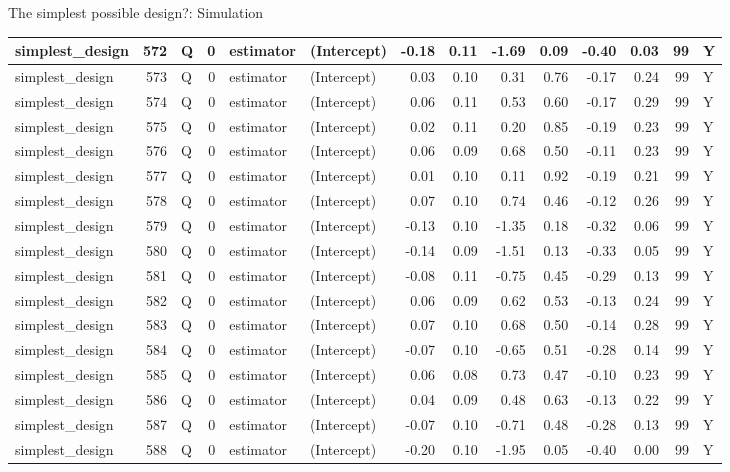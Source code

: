 \documentclass[
  11pt,
  ignorenonframetext,
]{beamer}
\begin{document}
\begin{frame}[fragile]{The simplest possible design?: Simulation}
\begin{tabular}{l|r|l|r|l|l|r|r|r|r|r|r|r|l}
\hline
simplest\_design & 572 & Q & 0 & estimator & (Intercept) & -0.18 & 0.11 & -1.69 & 0.09 & -0.40 & 0.03 & 99 & Y\\
\hline
simplest\_design & 573 & Q & 0 & estimator & (Intercept) & 0.03 & 0.10 & 0.31 & 0.76 & -0.17 & 0.24 & 99 & Y\\
\hline
simplest\_design & 574 & Q & 0 & estimator & (Intercept) & 0.06 & 0.11 & 0.53 & 0.60 & -0.17 & 0.29 & 99 & Y\\
\hline
simplest\_design & 575 & Q & 0 & estimator & (Intercept) & 0.02 & 0.11 & 0.20 & 0.85 & -0.19 & 0.23 & 99 & Y\\
\hline
simplest\_design & 576 & Q & 0 & estimator & (Intercept) & 0.06 & 0.09 & 0.68 & 0.50 & -0.11 & 0.23 & 99 & Y\\
\hline
simplest\_design & 577 & Q & 0 & estimator & (Intercept) & 0.01 & 0.10 & 0.11 & 0.92 & -0.19 & 0.21 & 99 & Y\\
\hline
simplest\_design & 578 & Q & 0 & estimator & (Intercept) & 0.07 & 0.10 & 0.74 & 0.46 & -0.12 & 0.26 & 99 & Y\\
\hline
simplest\_design & 579 & Q & 0 & estimator & (Intercept) & -0.13 & 0.10 & -1.35 & 0.18 & -0.32 & 0.06 & 99 & Y\\
\hline
simplest\_design & 580 & Q & 0 & estimator & (Intercept) & -0.14 & 0.09 & -1.51 & 0.13 & -0.33 & 0.05 & 99 & Y\\
\hline
simplest\_design & 581 & Q & 0 & estimator & (Intercept) & -0.08 & 0.11 & -0.75 & 0.45 & -0.29 & 0.13 & 99 & Y\\
\hline
simplest\_design & 582 & Q & 0 & estimator & (Intercept) & 0.06 & 0.09 & 0.62 & 0.53 & -0.13 & 0.24 & 99 & Y\\
\hline
simplest\_design & 583 & Q & 0 & estimator & (Intercept) & 0.07 & 0.10 & 0.68 & 0.50 & -0.14 & 0.28 & 99 & Y\\
\hline
simplest\_design & 584 & Q & 0 & estimator & (Intercept) & -0.07 & 0.10 & -0.65 & 0.51 & -0.28 & 0.14 & 99 & Y\\
\hline
simplest\_design & 585 & Q & 0 & estimator & (Intercept) & 0.06 & 0.08 & 0.73 & 0.47 & -0.10 & 0.23 & 99 & Y\\
\hline
simplest\_design & 586 & Q & 0 & estimator & (Intercept) & 0.04 & 0.09 & 0.48 & 0.63 & -0.13 & 0.22 & 99 & Y\\
\hline
simplest\_design & 587 & Q & 0 & estimator & (Intercept) & -0.07 & 0.10 & -0.71 & 0.48 & -0.28 & 0.13 & 99 & Y\\
\hline
simplest\_design & 588 & Q & 0 & estimator & (Intercept) & -0.20 & 0.10 & -1.95 & 0.05 & -0.40 & 0.00 & 99 & Y\\

\end{tabular}
\end{frame}
\end{document}

